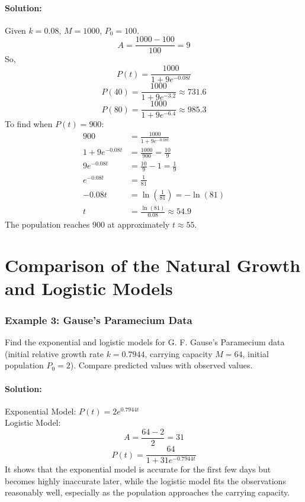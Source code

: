 \documentclass{article}
\begin{document}
\paragraph{Solution:}
Given $k = 0.08$, $M = 1000$, $P_0 = 100$.
\[
A = \frac{1000 - 100}{100} = 9
\]
So,
\[
P(t) = \frac{1000}{1 + 9e^{-0.08t}}
\]
\[
P(40) = \frac{1000}{1 + 9e^{-3.2}} \approx 731.6
\]
\[
P(80) = \frac{1000}{1 + 9e^{-6.4}} \approx 985.3
\]
To find when $P(t) = 900$:
\begin{align*}
900 &= \frac{1000}{1 + 9e^{-0.08t}} \\
1 + 9e^{-0.08t} &= \frac{1000}{900} = \frac{10}{9} \\
9e^{-0.08t} &= \frac{10}{9} - 1 = \frac{1}{9} \\
e^{-0.08t} &= \frac{1}{81} \\
-0.08t &= \ln\left(\frac{1}{81}\right) = -\ln(81) \\
t &= \frac{\ln(81)}{0.08} \approx 54.9
\end{align*}
The population reaches 900 at approximately $t \approx 55$.

\section*{Comparison of the Natural Growth and Logistic Models}

\subsubsection*{Example 3: Gause's Paramecium Data}
Find the exponential and logistic models for G. F. Gause's Paramecium data (initial relative growth rate $k = 0.7944$, carrying capacity $M = 64$, initial population $P_0 = 2$). Compare predicted values with observed values.

\paragraph{Solution:}
Exponential Model: $P(t) = 2e^{0.7944t}$ \\
Logistic Model:
\[
A = \frac{64 - 2}{2} = 31
\]
\[
P(t) = \frac{64}{1 + 31e^{-0.7944t}}
\]
It shows that the exponential model is accurate for the first few days but becomes highly inaccurate later, while the logistic model fits the observations reasonably well, especially as the population approaches the carrying capacity.
\end{document}
